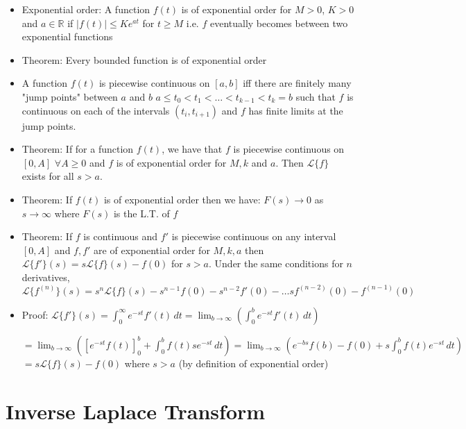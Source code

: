 \documentclass[12pt]{article}
\begin{document}
\begin{itemize}
    \item Exponential order: A function $f(t)$ is of exponential order for $M > 0$, $K > 0$ and $a \in \mathbb{R} $ if $|f(t)| \leq Ke^{at}$ for $t \geq M$ i.e. $f$ eventually becomes between two exponential functions
    \item Theorem: Every bounded function is of exponential order
    \item A function $f(t)$ is piecewise continuous on $[a,b]$ iff there are finitely many "jump points" between $a$ and $b$ $a \leq t_0 < t_1 < \dots < t_{k-1} < t_k = b$ such that $f$ is continuous on each of the intervals $(t_i, t_{i+1})$ and $f$ has finite limits at the jump points.
    \item Theorem: If for a function $f(t)$, we have that $f$ is piecewise continuous on $[0, A]$ $\forall A \geq 0$ and $f$ is of exponential order for $M, k$ and $a$. Then $\mathcal{L} \{f\}$ exists for all $s > a$. 
    \item Theorem: If $f(t)$ is of exponential order then we have: $F(s) \rightarrow 0$ as $s \rightarrow \infty$ where $F(s)$ is the L.T. of $f$
    \item Theorem: If $f$ is continuous and $f'$ is piecewise continuous on any interval $[0, A]$ and $f, f'$ are of exponential order for $M, k, a$ then $\mathcal{L} \{f'\} (s) = s \mathcal{L} \{f\} (s) - f(0)$ for $s>a$. Under the same conditions for $n$ derivatives, $\mathcal{L} \{f^{(n)}\} (s) = s^n \mathcal{L} \{f\} (s) - s^{n-1} f(0) - s^{n-2} f'(0) - \dots sf^{(n-2)} (0) - f^{(n-1)} (0)$ 
    \item Proof: $\mathcal{L} \{f'\} (s) = \int_{0}^{\infty} e^{-st} f'(t) \, dt = \lim_{b \rightarrow \infty} \left(\int_{0}^{b} e^{-st} f'(t) \, dt \right) $
    
    $= \lim_{b \rightarrow \infty} \left( \left[ e^{-st} f(t) \right]_{0}^{b} + \int_{0}^{b} f(t) s e^{-st} \, dt \right) = \lim_{b \rightarrow \infty} \left( e^{-bs}f(b) - f(0) + s \int_{0}^{b} f(t) e^{-st} \, dt \right) $ 
    $= s \mathcal{L} \{f\} (s) - f(0)$ where $s > a$ (by definition of exponential order)
\end{itemize} 

\section{Inverse Laplace Transform}
\end{document}
